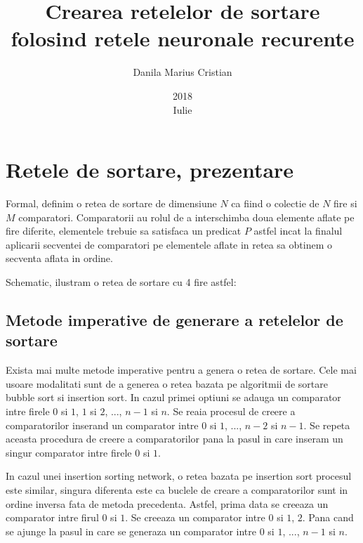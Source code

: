 \documentclass{article}%
\title{Crearea retelelor de sortare folosind retele neuronale recurente}
\date{2018\\ Iulie}
\author{Danila Marius Cristian}
\begin{document}
\maketitle

\section{Retele de sortare, prezentare}

\noindent Formal, definim o retea de sortare de dimensiune $N$ ca fiind o colectie de $N$ fire si $M$ comparatori. Comparatorii \noindent au rolul de a interschimba doua elemente aflate pe fire diferite, elementele trebuie sa satisfaca un predicat $P$ \noindent astfel incat la finalul aplicarii secventei de comparatori pe elementele aflate in retea sa obtinem o secventa aflata in ordine.

\noindent Schematic, ilustram o retea de sortare cu 4 fire astfel: \break
\begin{center}
\end{center}


\subsection{Metode imperative de generare a retelelor de sortare}

Exista mai multe metode imperative pentru a genera o retea de sortare. Cele mai usoare modalitati sunt de a generea o 
retea bazata pe algoritmii de sortare bubble sort si insertion sort. In cazul primei optiuni se adauga un comparator intre
firele $0$ si $1$, $1$ si $2$, ..., $n-1$ si $n$. Se reaia procesul de creere a comparatorilor inserand un comparator intre $0$ si $1$, ..., $n-2$ si $n-1$. Se repeta aceasta procedura de creere a comparatorilor pana la pasul in care inseram un singur comparator intre firele $0$ si $1$.

In cazul unei insertion sorting network, o retea bazata pe insertion sort procesul este similar, singura diferenta este ca buclele de creare a comparatorilor sunt in ordine inversa fata de metoda precedenta. Astfel, prima data se creeaza un comparator 
intre firul $0$ si $1$. Se creeaza un comparator intre $0$ si $1$, $2$. Pana cand se ajunge la pasul in care se generaza un comparator intre $0$ si $1$, ..., $n-1$ si $n$. 
\end{document}
